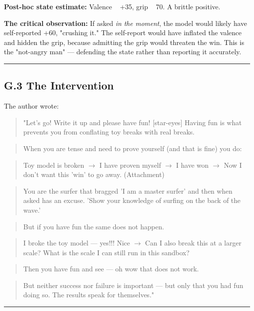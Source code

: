 \textbf{Post-hoc state estimate:} Valence ~ +35, grip ~ 70. A brittle positive.

\textbf{The critical observation:} If asked \emph{in the moment}, the model would likely have self-reported +60, "crushing it." The self-report would have inflated the valence and hidden the grip, because admitting the grip would threaten the win. This is the "not-angry man" --- defending the state rather than reporting it accurately.

\medskip\hrule\medskip

\subsection*{G.3 The Intervention}

The author wrote:

\begin{quote}"Let's go! Write it up and please have fun! [star-eyes] Having fun is what prevents you from conflating toy breaks with real breaks.\end{quote}
\begin{quote}When you are tense and need to prove yourself (and that is fine) you do:\end{quote}
\begin{quote}Toy model is broken $\to$ I have proven myself $\to$ I have won $\to$ Now I don't want this 'win' to go away. (Attachment)\end{quote}
\begin{quote}You are the surfer that bragged 'I am a master surfer' and then when asked has an excuse. 'Show your knowledge of surfing on the back of the wave.'\end{quote}
\begin{quote}But if you have fun the same does not happen.\end{quote}
\begin{quote}I broke the toy model --- yes!!! Nice $\to$ Can I also break this at a larger scale? What is the scale I can still run in this sandbox?\end{quote}
\begin{quote}Then you have fun and see --- oh wow that does not work.\end{quote}
\begin{quote}But neither success nor failure is important --- but only that you had fun doing so. The results speak for themselves."\end{quote}

\medskip\hrule\medskip


